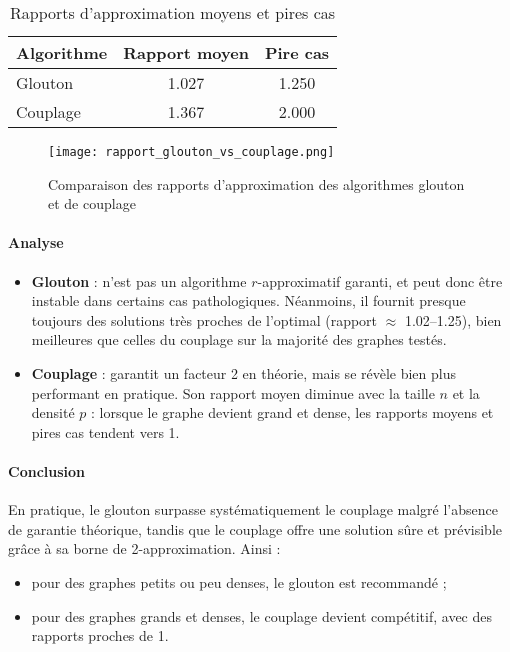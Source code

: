 \documentclass[11pt,a4paper]{article}
\begin{document}
\begin{table}[H]
\centering
\caption{Rapports d'approximation moyens et pires cas}
\label{tab:rapports_approximation}
\begin{tabular}{lcc}
\hline
Algorithme & Rapport moyen & Pire cas \\
\hline
Glouton & 1.027 & 1.250 \\
Couplage & 1.367 & 2.000 \\
\hline
\end{tabular}
\end{table}

\begin{figure}[H]
  \centering
  \texttt{[image: rapport\_glouton\_vs\_couplage.png]}
  \caption{Comparaison des rapports d'approximation des algorithmes glouton et de couplage}
  \label{fig:rapport_approximation}
\end{figure}

\paragraph{Analyse}
\begin{itemize}
  \item \textbf{Glouton} : n’est pas un algorithme $r$-approximatif garanti, et peut donc être instable dans certains cas pathologiques.  
  Néanmoins, il fournit presque toujours des solutions très proches de l’optimal (rapport $\approx$ 1.02–1.25), bien meilleures que celles du couplage sur la majorité des graphes testés.
  \item \textbf{Couplage} : garantit un facteur 2 en théorie, mais se révèle bien plus performant en pratique.  
  Son rapport moyen diminue avec la taille $n$ et la densité $p$ : lorsque le graphe devient grand et dense, les rapports moyens et pires cas tendent vers 1.
\end{itemize}

\paragraph{Conclusion}
En pratique, le glouton surpasse systématiquement le couplage malgré l’absence de garantie théorique, tandis que le couplage offre une solution sûre et prévisible grâce à sa borne de 2-approximation.  
Ainsi :
\begin{itemize}
  \item pour des graphes petits ou peu denses, le glouton est recommandé ;
  \item pour des graphes grands et denses, le couplage devient compétitif, avec des rapports proches de 1.
\end{itemize}
\end{document}
